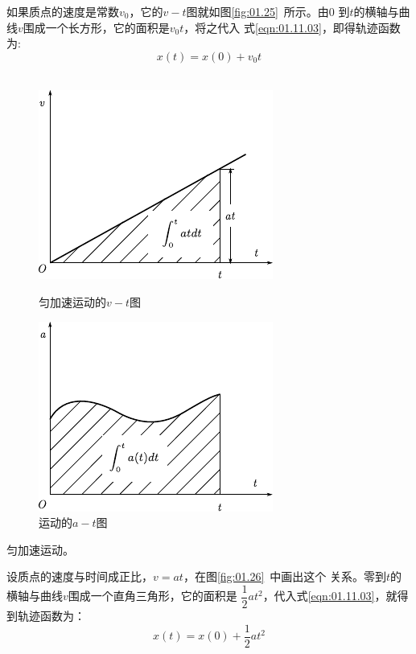 如果质点的速度是常数$v_0$，它的$v-t$图就如图\ref{fig:01.25}~所示。由0
到$t$的横轴与曲线$v$围成一个长方形，它的面积是$v_0t$，将之代入
式\eqref{eqn:01.11.03}，即得轨迹函数为:
\begin{equation}\label{eqn:01.11.04}
    x(t)=x(0)+v_0 t
\end{equation}
~\vspace{-1.5em}
\begin{figure}[!h]
    \begin{minipage}[b]{14em}
        \centering
        \includegraphics{figure/fig01.26}
        \caption{匀加速运动的$v-t$图}
        \label{fig:01.26}
    \end{minipage}\hfill
    \begin{minipage}[b]{14em}
        \centering
        \includegraphics{figure/fig01.27}
        \caption{运动的$a-t$图}
        \label{fig:01.27}
    \end{minipage}
\end{figure}

  \vspace{-1em}\example 匀加速运动。

  设质点的速度与时间成正比，$v=at$，在图\ref{fig:01.26}~中画出这个
关系。零到$t$的横轴与曲线$v$围成一个直角三角形，它的面积是
$\dfrac{1}{2} a t^2$，代入式\eqref{eqn:01.11.03}，就得到轨迹函数为：
\begin{equation*}\label{eqn:01.11.04i}
    x(t)=x(0)+\frac{1}{2}at^2 \tag{1.11.4$'$}
\end{equation*}

